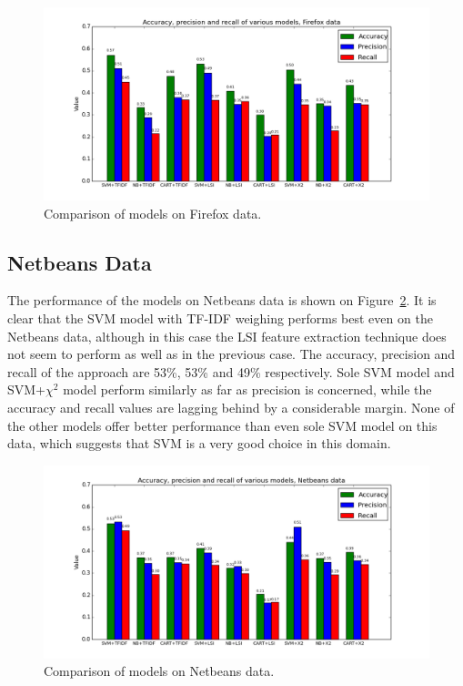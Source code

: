 \begin{figure}[htbp]
    \centering
        \includegraphics[width=\textwidth]{./images/comparison_of_models/firefox.png}
    \caption{Comparison of models on Firefox data.}
    \label{fig:results.models.firefox}
\end{figure}

\subsection{Netbeans Data}

The performance of the models on Netbeans data is shown on Figure~\ref{fig:results.models.netbeans}. It is clear that the SVM model with TF-IDF weighing performs best even on the Netbeans data, although in this case the LSI feature extraction technique does not seem to perform as well as in the previous case. The accuracy, precision and recall of the approach are 53\%, 53\% and 49\% respectively. Sole SVM model and SVM+$\chi^2$ model perform similarly as far as precision is concerned, while the accuracy and recall values are lagging behind by a considerable margin. None of the other models offer better performance than even sole SVM model on this data, which suggests that SVM is a very good choice in this domain.

\begin{figure}[htbp]
    \centering
        \includegraphics[width=\textwidth]{./images/comparison_of_models/netbeans.png}
    \caption{Comparison of models on Netbeans data.}
    \label{fig:results.models.netbeans}
\end{figure}

